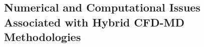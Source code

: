 \documentclass[preprint,12pt]{elsarticle}
\begin{document}


\subsection{Numerical and Computational Issues Associated with Hybrid CFD-MD Methodologies}
\end{document}
